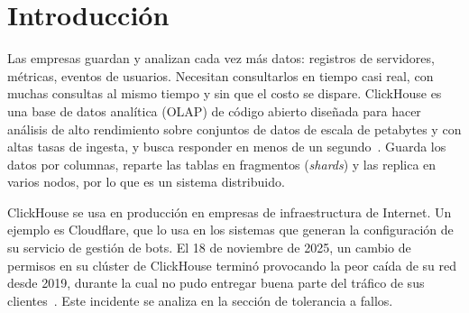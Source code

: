 \documentclass[12pt,a4paper]{article}
\begin{document}
\begin{abstract}
Este informe analiza ClickHouse, una base de datos analítica de código
abierto, como sistema distribuido, y lo compara con Elasticsearch.
Apliqué los conceptos de la Unidad~1 (transparencias de distribución,
teorema CAP y su extensión PACELC, modelos de comunicación y tolerancia
a fallos) a partir de artículos científicos y de un experimento propio:
un clúster con dos réplicas y tres nodos de ClickHouse Keeper, montado
con Docker en mi computadora. En cuatro pruebas detuve la copia entre
réplicas, apagué una réplica, dejé a Keeper sin mayoría y medí la
latencia de escritura con y sin quórum. Los resultados muestran que, por
defecto, ClickHouse prioriza la disponibilidad y la latencia: aceptó
escrituras con una réplica caída, y una réplica llegó a responder con
46~segundos de atraso. Exigir el quórum de dos réplicas garantizó la
consistencia, pero multiplicó por 4,1 el tiempo promedio de escritura.
Sin mayoría en Keeper, las tablas quedaron en solo lectura. Concluyo que
ClickHouse oculta dónde están los datos, pero no cuándo se actualizan, y
que es adecuado para analizar grandes volúmenes de datos, pero no para
sistemas transaccionales.
\end{abstract}

\tableofcontents
\newpage
{}


\section{Introducción}
Las empresas guardan y analizan cada vez más datos: registros de
servidores, métricas, eventos de usuarios. Necesitan consultarlos en
tiempo casi real, con muchas consultas al mismo tiempo y sin que el costo
se dispare. ClickHouse es una base de datos analítica (OLAP) de código
abierto diseñada para hacer análisis de alto rendimiento sobre conjuntos
de datos de escala de petabytes y con altas tasas de ingesta, y busca
responder en menos de un segundo~\cite{schulze2024}. Guarda los datos
por columnas, reparte las tablas en fragmentos (\emph{shards}) y las
replica en varios nodos, por lo que es un sistema distribuido.

ClickHouse se usa en producción en empresas de infraestructura de
Internet. Un ejemplo es Cloudflare, que lo usa en los sistemas que
generan la configuración de su servicio de gestión de bots. El 18 de
noviembre de 2025, un cambio de permisos en su clúster de ClickHouse
terminó provocando la peor caída de su red desde 2019, durante la cual
no pudo entregar buena parte del tráfico de sus clientes~\cite{cloudflare2025}.
Este incidente se analiza en la sección de tolerancia a fallos.
\end{document}
